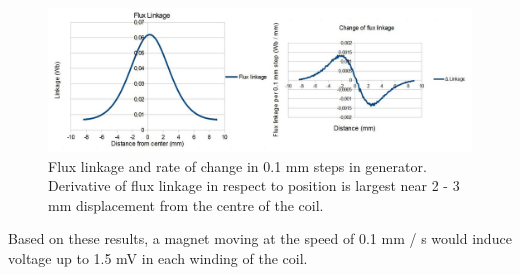 \begin{figure}[htb]
\begin{center}
\includegraphics[width=\columnwidth]{images/own_dwg/femm_flux_dualmagnet.jpg}
\end{center}
\caption{\label{fig:femm_linkage} Flux linkage and rate of change in 0.1 mm steps in generator. Derivative of flux linkage in respect to position is largest near 2 - 3 mm displacement from the centre of the coil.}
\end{figure}

Based on these results, a magnet moving at the speed of 0.1 mm / s would induce voltage up to 1.5 mV  in each winding of the coil.

